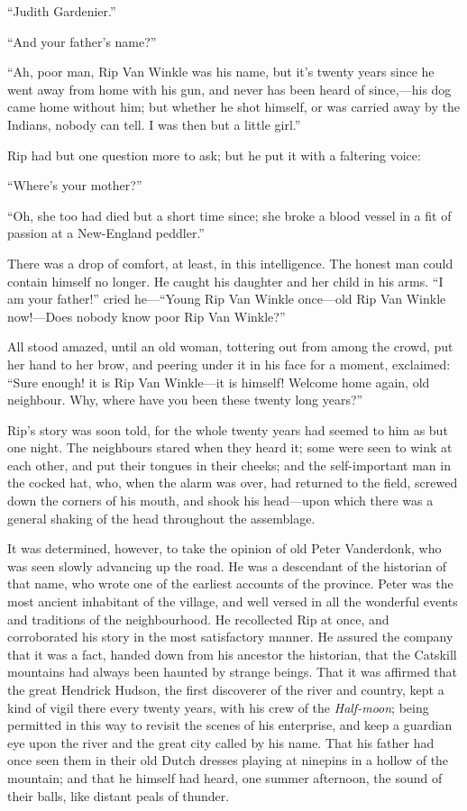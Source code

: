 “Judith Gardenier.”

“And your father’s name?”

“Ah, poor man, Rip Van Winkle was his name, but it’s twenty years since he went away from home with his gun, and never has been heard of since,—his dog came home without him; but whether he shot himself, or was carried away by the Indians, nobody can tell. I was then but a little girl.”

Rip had but one question more to ask; but he put it with a faltering voice:

“Where’s your mother?”

“Oh, she too had died but a short time since; she broke a blood vessel in a fit of passion at a New-England peddler.”

There was a drop of comfort, at least, in this intelligence. The honest man could contain himself no longer. He caught his daughter and her child in his arms. “I am your father!” cried he—“Young Rip Van Winkle once—old Rip Van Winkle now!—Does nobody know poor Rip Van Winkle?”

All stood amazed, until an old woman, tottering out from among the crowd, put her hand to her brow, and peering under it in his face for a moment, exclaimed: “Sure enough! it is Rip Van Winkle—it is himself! Welcome home again, old neighbour. Why, where have you been these twenty long years?”

Rip’s story was soon told, for the whole twenty years had seemed to him as but one night. The neighbours stared when they heard it; some were seen to wink at each other, and put their tongues in their cheeks; and the self-important man in the cocked hat, who, when the alarm was over, had returned to the field, screwed down the corners of his mouth, and shook his head—upon which there was a general shaking of the head throughout the assemblage.

It was determined, however, to take the opinion of old Peter Vanderdonk, who was seen slowly advancing up the road. He was a descendant of the historian of that name, who wrote one of the earliest accounts of the province. Peter was the most ancient inhabitant of the village, and well versed in all the wonderful events and traditions of the neighbourhood. He recollected Rip at once, and corroborated his story in the most satisfactory manner. He assured the company that it was a fact, handed down from his ancestor the historian, that the Catskill mountains had always been haunted by strange beings. That it was affirmed that the great Hendrick Hudson, the first discoverer of the river and country, kept a kind of vigil there every twenty years, with his crew of the \textit{Half-moon}; being permitted in this way to revisit the scenes of his enterprise, and keep a guardian eye upon the river and the great city called by his name. That his father had once seen them in their old Dutch dresses playing at ninepins in a hollow of the mountain; and that he himself had heard, one summer afternoon, the sound of their balls, like distant peals of thunder.

